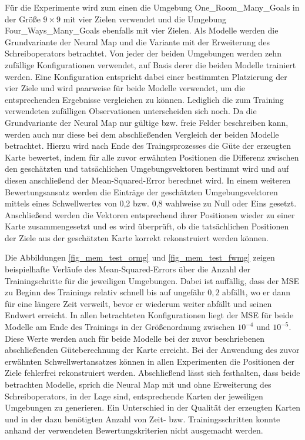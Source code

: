 Für die Experimente wird zum einen die Umgebung \glqq One\_Room\_Many\_Goals\grqq{} in der Größe $9 \times 9$ mit vier Zielen verwendet und die Umgebung \glqq Four\_Ways\_Many\_Goals\grqq{} ebenfalls mit vier Zielen. Als Modelle werden die Grundvariante der Neural Map und die Variante mit der Erweiterung des Schreiboperators betrachtet. Von jeder der beiden Umgebungen werden zehn zufällige Konfigurationen verwendet, auf Basis derer die beiden Modelle trainiert werden. Eine Konfiguration entspricht dabei einer bestimmten Platzierung der vier Ziele und wird paarweise für beide Modelle verwendet, um die entsprechenden Ergebnisse vergleichen zu können. Lediglich die zum Training verwendeten zufälligen Observationen unterscheiden sich noch. Da die Grundvariante der Neural Map nur gültige bzw. freie Felder beschreiben kann, werden auch nur diese bei dem abschließenden Vergleich der beiden Modelle betrachtet. Hierzu wird nach Ende des Traingsprozesses die Güte der erzeugten Karte bewertet, indem für alle zuvor erwähnten Positionen die Differenz zwischen den geschätzten und tatsächlichen Umgebungsvektoren bestimmt wird und auf diesen anschließend der Mean-Squared-Error berechnet wird. In einem weiteren Bewertungsansatz werden die Einträge der geschätzten Umgebungsvektoren mittels eines Schwellwertes von 0,2 bzw. 0,8 wahlweise zu Null oder Eins gesetzt. Anschließend werden die Vektoren entsprechend ihrer Positionen wieder zu einer Karte zusammengesetzt und es wird überprüft, ob die tatsächlichen Positionen der Ziele aus der geschätzten Karte korrekt rekonstruiert werden können.

Die Abbildungen \ref{fig_mem_test_ormg} und \ref{fig_mem_test_fwmg} zeigen beispielhafte Verläufe des Mean-Squared-Errors über die Anzahl der Trainingschritte für die jeweiligen Umgebungen. Dabei ist auffällig, dass der MSE zu Beginn des Trainings relativ schnell bis auf ungefähr $0,2$ abfällt, wo er dann für eine längere Zeit verweilt, bevor er wiederum weiter abfällt und seinen Endwert erreicht. In allen betrachteten Konfigurationen liegt der MSE für beide Modelle am Ende des Trainings in der Größenordnung zwischen $10^{-4}$ und $10^{-5}$. Diese Werte werden auch für beide Modelle bei der zuvor beschriebenen abschließenden Güteberechnung der Karte erreicht. Bei der Anwendung des zuvor erwähnten Schwellwertansatzes können in allen Experimenten die Positionen der Ziele fehlerfrei rekonstruiert werden. Abschließend lässt sich festhalten, dass beide betrachten Modelle, sprich die Neural Map mit und ohne Erweiterung des Schreiboperators, in der Lage sind, entsprechende Karten der jeweiligen Umgebungen zu generieren. Ein Unterschied in der Qualität der erzeugten Karten und in der dazu benötigten Anzahl von Zeit- bzw. Trainingsschritten konnte anhand der verwendeten Bewertungskriterien nicht ausgemacht werden.


